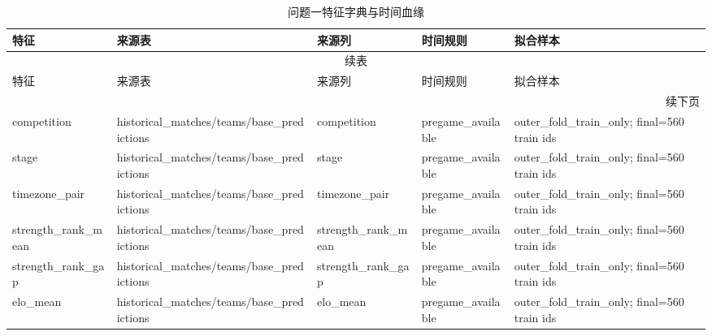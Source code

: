 {
\footnotesize
\hfuzz=0.2pt
\setlength{\tabcolsep}{3pt}
\begin{longtable}{p{}p{}p{}p{}p{}}
\caption{问题一特征字典与时间血缘}\label{tab:q1-data-dictionary}\\
\toprule
特征 & 来源表 & 来源列 & 时间规则 & 拟合样本 \\
\midrule
\endfirsthead
\multicolumn{5}{c}{续表} \\
\toprule
特征 & 来源表 & 来源列 & 时间规则 & 拟合样本 \\
\midrule
\endhead
\midrule \multicolumn{5}{r}{续下页} \\
\endfoot
\bottomrule
\endlastfoot
competition & historical\_\allowbreak{}matches/\allowbreak{}teams/\allowbreak{}base\_\allowbreak{}predictions & competition & pregame\_\allowbreak{}available & outer\_\allowbreak{}fold\_\allowbreak{}train\_\allowbreak{}only;\allowbreak{} final=560 train ids \\
stage & historical\_\allowbreak{}matches/\allowbreak{}teams/\allowbreak{}base\_\allowbreak{}predictions & stage & pregame\_\allowbreak{}available & outer\_\allowbreak{}fold\_\allowbreak{}train\_\allowbreak{}only;\allowbreak{} final=560 train ids \\
timezone\_\allowbreak{}pair & historical\_\allowbreak{}matches/\allowbreak{}teams/\allowbreak{}base\_\allowbreak{}predictions & timezone\_\allowbreak{}pair & pregame\_\allowbreak{}available & outer\_\allowbreak{}fold\_\allowbreak{}train\_\allowbreak{}only;\allowbreak{} final=560 train ids \\
strength\_\allowbreak{}rank\_\allowbreak{}mean & historical\_\allowbreak{}matches/\allowbreak{}teams/\allowbreak{}base\_\allowbreak{}predictions & strength\_\allowbreak{}rank\_\allowbreak{}mean & pregame\_\allowbreak{}available & outer\_\allowbreak{}fold\_\allowbreak{}train\_\allowbreak{}only;\allowbreak{} final=560 train ids \\
strength\_\allowbreak{}rank\_\allowbreak{}gap & historical\_\allowbreak{}matches/\allowbreak{}teams/\allowbreak{}base\_\allowbreak{}predictions & strength\_\allowbreak{}rank\_\allowbreak{}gap & pregame\_\allowbreak{}available & outer\_\allowbreak{}fold\_\allowbreak{}train\_\allowbreak{}only;\allowbreak{} final=560 train ids \\
elo\_\allowbreak{}mean & historical\_\allowbreak{}matches/\allowbreak{}teams/\allowbreak{}base\_\allowbreak{}predictions & elo\_\allowbreak{}mean & pregame\_\allowbreak{}available & outer\_\allowbreak{}fold\_\allowbreak{}train\_\allowbreak{}only;\allowbreak{} final=560 train ids \\

\end{longtable}}
